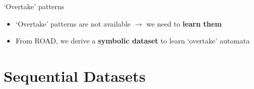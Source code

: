 \documentclass[10pt, aspectratio=169]{beamer}
\begin{document}
\fi

\begin{frame}{`Overtake' patterns}
       \begin{itemize}
        \setlength{\itemsep}{16pt}
        \item `Overtake' patterns are not available $\rightarrow$ we need to \textbf{learn them}
        \item From ROAD, we derive a \textbf{symbolic dataset} to learn `overtake' automata
    \end{itemize}
\end{frame}

\section{Sequential Datasets}
{
    \begin{frame}
        \sectionpage%
    \end{frame}
}
\end{document}
